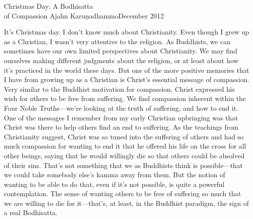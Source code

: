 {Christmas Day: A Bodhisatta\\of Compassion}
{Ajahn Karuṇadhammo}{December 2012}

It's Christmas day. I don't know much about Christianity. Even though I 
grew up as a Christian, I wasn't very attentive to the religion. As 
Buddhists, we can sometimes have our own limited perspectives about 
Christianity. We may find ourselves making different judgments about 
the religion, or at least about how it's practiced in the world these 
days. But one of the more positive memories that I have from growing up 
as a Christian is Christ's essential message of compassion. Very 
similar to the Buddhist motivation for compassion, Christ expressed his 
wish for others to be free from suffering. We find compassion inherent 
within the Four Noble Truths---we're looking at the truth of suffering, 
and how to end it. One of the messages I remember from my early 
Christian upbringing was that Christ was there to help others find an 
end to suffering. As the teachings from Christianity suggest, Christ 
was so tuned into the suffering of others and had so much compassion 
for wanting to end it that he offered his life on the cross for all 
other beings, saying that he would willingly die so that others could 
be absolved of their sins. That's not something that we as Buddhists 
think is possible---that we could take somebody else's kamma away from 
them. But the notion of wanting to be able to do that, even if it's not 
possible, is quite a powerful contemplation. The sense of wanting 
others to be free of suffering so much that we are willing to die for 
it---that's, at least, in the Buddhist paradigm, the sign of a real 
Bodhisatta.

